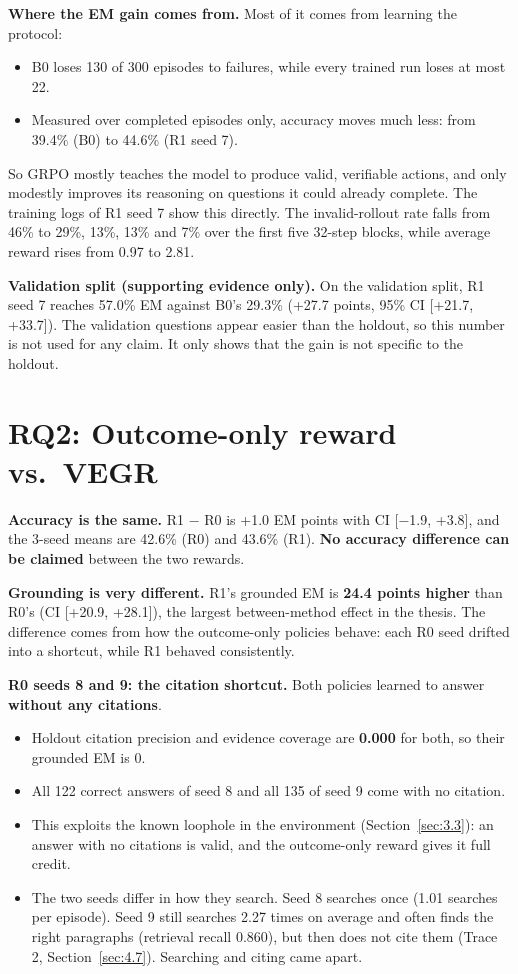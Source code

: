 \textbf{Where the EM gain comes from.} Most of it comes from learning
the protocol:

\begin{itemize}
\tightlist
\item
  B0 loses 130 of 300 episodes to failures, while every trained run
  loses at most 22.
\item
  Measured over completed episodes only, accuracy moves much less: from
  39.4\% (B0) to 44.6\% (R1 seed 7).
\end{itemize}

So GRPO mostly teaches the model to produce valid, verifiable actions,
and only modestly improves its reasoning on questions it could already
complete. The training logs of R1 seed 7 show this directly. The
invalid-rollout rate falls from 46\% to 29\%, 13\%, 13\% and 7\% over
the first five 32-step blocks, while average reward rises from 0.97 to
2.81.

\textbf{Validation split (supporting evidence only).} On the validation
split, R1 seed 7 reaches 57.0\% EM against B0's 29.3\% (+27.7 points,
95\% CI {[}+21.7, +33.7{]}). The validation questions appear easier than
the holdout, so this number is not used for any claim. It only shows
that the gain is not specific to the holdout.

\section{RQ2: Outcome-only reward vs.~VEGR}\label{sec:4.4}

\textbf{Accuracy is the same.} R1 − R0 is +1.0 EM points with CI
{[}−1.9, +3.8{]}, and the 3-seed means are 42.6\% (R0) and 43.6\% (R1).
\textbf{No accuracy difference can be claimed} between the two rewards.

\textbf{Grounding is very different.} R1's grounded EM is \textbf{24.4
points higher} than R0's (CI {[}+20.9, +28.1{]}), the largest
between-method effect in the thesis. The difference comes from how the
outcome-only policies behave: each R0 seed drifted into a shortcut,
while R1 behaved consistently.

\textbf{R0 seeds 8 and 9: the citation shortcut.} Both policies learned
to answer \textbf{without any citations}.

\begin{itemize}
\tightlist
\item
  Holdout citation precision and evidence coverage are \textbf{0.000}
  for both, so their grounded EM is 0.
\item
  All 122 correct answers of seed 8 and all 135 of seed 9 come with no
  citation.
\item
  This exploits the known loophole in the environment
  (Section~\ref{sec:3.3}): an answer with no citations is valid, and the
  outcome-only reward gives it full credit.
\item
  The two seeds differ in how they search. Seed 8 searches once (1.01
  searches per episode). Seed 9 still searches 2.27 times on average and
  often finds the right paragraphs (retrieval recall 0.860), but then
  does not cite them (Trace 2, Section~\ref{sec:4.7}). Searching and
  citing came apart.
\end{itemize}

